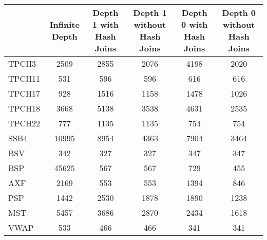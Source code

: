 \begin{tabular}{|l|c|c|c|c|c|}\hline 
\ & Infinite Depth & Depth 1 with Hash Joins & Depth 1 without Hash Joins & Depth 0 with Hash Joins & Depth 0 without Hash Joins \\\hline 
TPCH3 & 2509 & 2855 & 2076 & 4198 & 2020 \\\hline
TPCH11 & 531 & 596 & 596 & 616 & 616 \\\hline
TPCH17 & 928 & 1516 & 1158 & 1478 & 1026 \\\hline
TPCH18 & 3668 & 5138 & 3538 & 4631 & 2535 \\\hline
TPCH22 & 777 & 1135 & 1135 & 754 & 754 \\\hline
SSB4 & 10995 & 8954 & 4363 & 7904 & 3464 \\\hline
BSV & 342 & 327 & 327 & 347 & 347 \\\hline
BSP & 45625 & 567 & 567 & 729 & 455 \\\hline
AXF & 2169 & 553 & 553 & 1394 & 846 \\\hline
PSP & 1442 & 2530 & 1878 & 1890 & 1238 \\\hline
MST & 5457 & 3686 & 2870 & 2434 & 1618 \\\hline
VWAP & 533 & 466 & 466 & 341 & 341 \\\hline
\end{tabular}